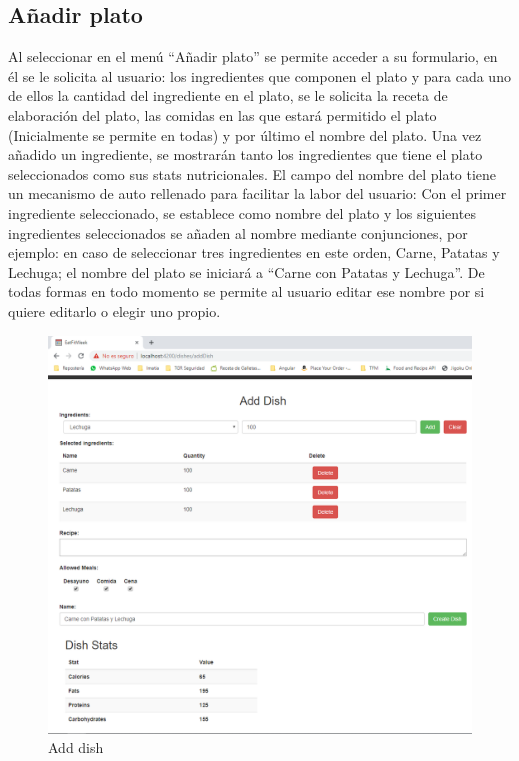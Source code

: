 \documentclass[12pt, a4paper, twoside]{book}
\begin{document}
	\subsection{Añadir plato}
	Al seleccionar en el menú ``Añadir plato'' se permite acceder a su formulario, en él se le solicita al usuario: los ingredientes que componen el plato y para cada uno de ellos la cantidad del ingrediente en el plato, se le solicita la receta de elaboración del plato, las comidas en las que estará permitido el plato (Inicialmente se permite en todas) y por último el nombre del plato.
	Una vez añadido un ingrediente, se mostrarán tanto los ingredientes que tiene el plato seleccionados como sus stats nutricionales. El campo del nombre del plato tiene un mecanismo de auto rellenado para facilitar la labor del usuario: Con el primer ingrediente seleccionado, se establece como nombre del plato y los siguientes ingredientes seleccionados se añaden al nombre mediante conjunciones, por ejemplo: en caso de seleccionar tres ingredientes en este orden, Carne, Patatas y Lechuga; el nombre del plato se iniciará a ``Carne con Patatas y Lechuga''. De todas formas en todo momento se permite al usuario editar ese nombre por si quiere editarlo o elegir uno propio.
	\begin{figure}[H]
		\centering
		\includegraphics[width=15cm]{Imagenes/MU-AddDish.png}
		\caption{Add dish}\label{Add dish}
	\end{figure}
\end{document}
